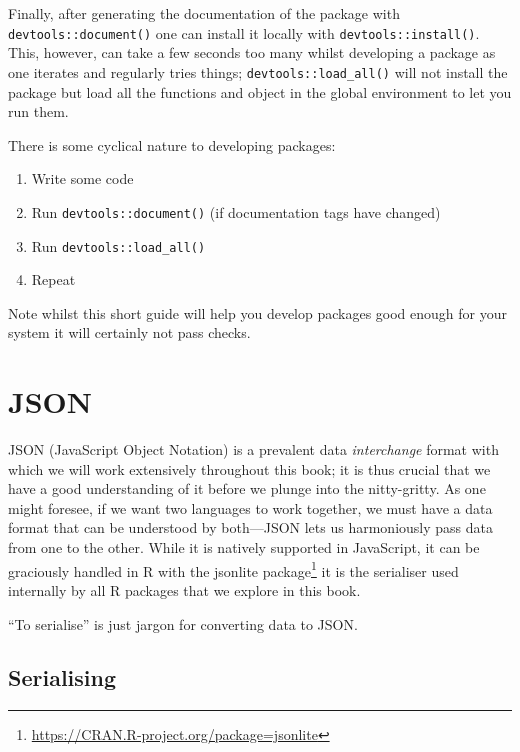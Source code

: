 \documentclass[10pt,]{krantz}
\makeatletter
\providecommand{\tightlist}{%
  \setlength{\itemsep}{0pt}\setlength{\parskip}{0pt}}
\renewcommand{\href}[2]{#2\footnote{\url{#1}}}
\newenvironment{kframe}{%
\medskip{}
\setlength{\fboxsep}{.8em}
 \def\at@end@of@kframe{}%
 \ifinner\ifhmode%
  \def\at@end@of@kframe{\end{minipage}}%
  \begin{minipage}{\columnwidth}%
 \fi\fi%
 \def\FrameCommand##1{\hskip\@totalleftmargin \hskip-\fboxsep
 \colorbox{shadecolor}{##1}\hskip-\fboxsep
     \hskip-\linewidth \hskip-\@totalleftmargin \hskip\columnwidth}%
 \MakeFramed {\advance\hsize-\width
   \@totalleftmargin\z@ \linewidth\hsize
   \@setminipage}}%
 {\par\unskip\endMakeFramed%
 \at@end@of@kframe}
\newenvironment{rmdblock}[1]
  {
  \begin{itemize}
  \renewcommand{\labelitemi}{
    \raisebox{-.7\height}[0pt][0pt]{
      {\setkeys{Gin}{width=3em,keepaspectratio}\texttt{[image: images/\#1]}}
    }
  }
  \setlength{\fboxsep}{1em}
  \begin{kframe}
  \item
  }
  {
  \end{kframe}
  \end{itemize}
  }
\newenvironment{rmdnote}
  {\begin{rmdblock}{note}}
  {\end{rmdblock}}
\makeatother
\begin{document}
Finally, after generating the documentation of the package with \texttt{devtools::document()} one can install it locally with \texttt{devtools::install()}. This, however, can take a few seconds too many whilst developing a package as one iterates and regularly tries things; \texttt{devtools::load\_all()} will not install the package but load all the functions and object in the global environment to let you run them.

There is some cyclical nature to developing packages:

\begin{enumerate}
\def\labelenumi{\arabic{enumi}.}
\tightlist
\item
  Write some code
\item
  Run \texttt{devtools::document()} (if documentation tags have changed)
\item
  Run \texttt{devtools::load\_all()}
\item
  Repeat
\end{enumerate}

Note whilst this short guide will help you develop packages good enough for your system it will certainly not pass  checks.

\hypertarget{basics-json}{%
\section{JSON}\label{basics-json}}

JSON (JavaScript Object Notation) is a prevalent data \emph{interchange} format with which we will work extensively throughout this book; it is thus crucial that we have a good understanding of it before we plunge into the nitty-gritty. As one might foresee, if we want two languages to work together, we must have a data format that can be understood by both---JSON lets us harmoniously pass data from one to the other. While it is natively supported in JavaScript, it can be graciously handled in R with the \href{https://CRAN.R-project.org/package=jsonlite}{jsonlite package} \citep{R-jsonlite} it is the serialiser used internally by all R packages that we explore in this book.

\begin{rmdnote}
``To serialise'' is just jargon for converting data to
JSON.
\end{rmdnote}

\hypertarget{serialising}{%
\subsection{Serialising}\label{serialising}}
\end{document}
